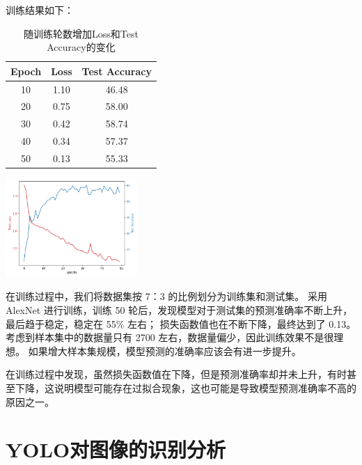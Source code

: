 \documentclass[UTF8]{ctexart}
\begin{document}
训练结果如下：
\begin{table}[H]
    \begin{minipage}[b]{0.56\linewidth}
    \centering
    \begin{tabular}{c|c|c}
        \hline
        Epoch & Loss & Test Accuracy \\ \hline \hline
        10 & 1.10 & 46.48 \\ \hline
        20 & 0.75 & 58.00 \\ \hline
        30 & 0.42 & 58.74 \\ \hline
        40 & 0.34 & 57.37 \\ \hline
        50 & 0.13 & 55.33 \\ \hline
       \end{tabular}
        \caption{随训练轮数增加Loss和Test Accuracy的变化}
    \end{minipage}
    \begin{minipage}[b]{0.4\linewidth}
    \centering
    \includegraphics[width=50mm]{../AlexNet/AlexNet.png}
    \end{minipage}
    \end{table}



在训练过程中，我们将数据集按 7：3 的比例划分为训练集和测试集。
采用 AlexNet 进行训练，训练 50 轮后，发现模型对于测试集的预测准确率不断上升，最后趋于稳定，稳定在 55\% 左右；
损失函数值也在不断下降，最终达到了 0.13。考虑到样本集中的数据量只有 2700 左右，数据量偏少，因此训练效果不是很理想。
如果增大样本集规模，模型预测的准确率应该会有进一步提升。 \par
在训练过程中发现，虽然损失函数值在下降，但是预测准确率却并未上升，有时甚至下降，这说明模型可能存在过拟合现象，这也可能是导致模型预测准确率不高的原因之一。

\section{YOLO对图像的识别分析}
\end{document}
